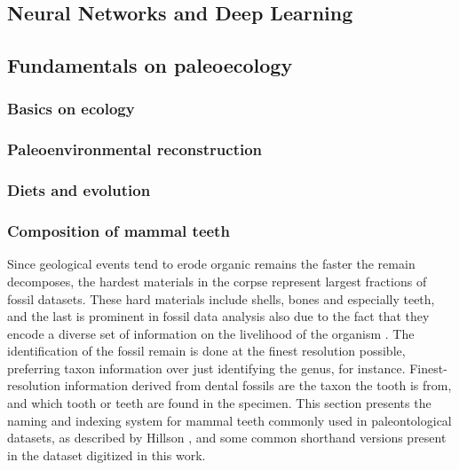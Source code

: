 \documentclass{article}
\begin{document}
\subsection{Neural Networks and Deep Learning}

\subsection{Fundamentals on paleoecology}

\subsubsection{Basics on ecology}

\subsubsection{Paleoenvironmental reconstruction}

\subsubsection{Diets and evolution}

\subsubsection{Composition of mammal teeth}


Since geological events tend to erode organic remains the faster the remain decomposes, the hardest materials in 
the corpse represent largest fractions of fossil datasets. These hard materials include shells, bones and especially teeth, and 
the last is prominent in fossil data analysis also due to the fact that they encode a diverse set of information on 
the livelihood of the organism \cite{Faith_Lyman_2019}. The identification of the fossil remain is done at the finest resolution possible,
preferring taxon information over just identifying the genus, for instance. Finest-resolution information 
derived from dental fossils are the taxon the tooth is from, and which tooth or teeth are found in the specimen.
This section presents the naming and indexing system for mammal teeth commonly used in paleontological datasets,
as described by Hillson \cite{Hillson_2005}, and some common shorthand versions present in the dataset digitized in this work.
\end{document}
